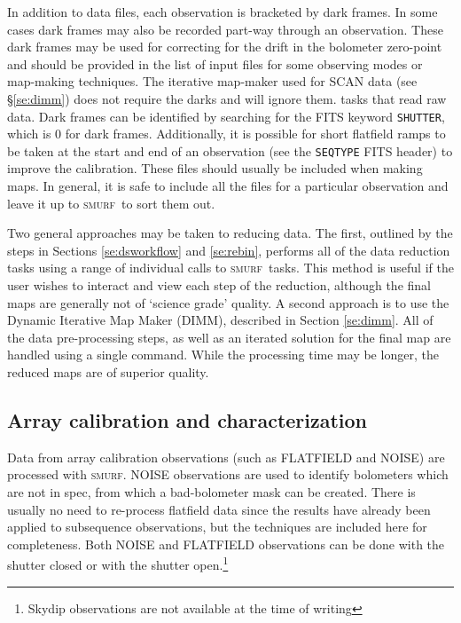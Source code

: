 \documentclass[twoside,11pt]{article}
\newcommand{\xlabel}[1]{}
\renewcommand{\_}{\texttt{\symbol{95}}}
\newcommand{\SMURF}{\textsc{smurf}}
\begin{document}
In addition to data files, each observation is bracketed by dark
frames. In some cases dark frames may also be recorded part-way
through an observation. These dark frames may be used for correcting
for the drift in the bolometer zero-point and should be provided in
the list of input files for some observing modes or map-making
techniques. The iterative map-maker used for SCAN data (see
\S\ref{se:dimm}) does not require the darks and will ignore them.
 tasks that read raw data. Dark frames can be identified by searching
 for the FITS keyword \texttt{SHUTTER}, which is 0 for dark
 frames. Additionally, it is possible for short flatfield ramps to be
 taken at the start and end of an observation (see the
 \texttt{SEQ\_TYPE} FITS header) to improve the calibration. These
 files should usually be included when making maps. In general, it is
 safe to include all the files for a particular observation and leave
 it up to \SMURF\ to sort them out.

Two general approaches may be taken to reducing data. The first,
outlined by the steps in Sections \ref{se:dsworkflow} and
\ref{se:rebin}, performs all of the data reduction tasks using a range
of individual calls to \SMURF\ tasks. This method is useful if the user
wishes to interact and view each step of the reduction, although the final
maps are generally not of `science grade' quality. A second approach is to
use the Dynamic Iterative Map Maker (DIMM), described in Section
\ref{se:dimm}. All of the data pre-processing steps, as well as an
iterated solution for the final map are handled using a single
command. While the processing time may be longer, the reduced maps are
of superior quality.

\subsection{\xlabel{arraycal}Array calibration and characterization\label{se:arraycal}}

Data from array calibration observations (such as FLATFIELD and NOISE)
are processed with \SMURF. NOISE observations are used to identify
bolometers which are not in spec, from which a bad-bolometer mask can
be created. There is usually no need to re-process flatfield data
since the results have already been applied to subsequence observations, but
the techniques are included here for completeness. Both NOISE and
FLATFIELD observations can be done with the shutter closed or with the
shutter open.\footnote{Skydip observations are not available at the
  time of writing}
\end{document}
